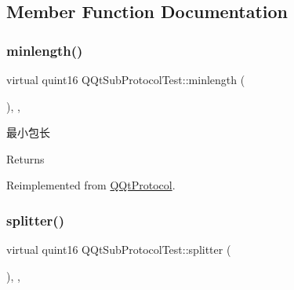 \subsection{Member Function Documentation}
\mbox{\label{class_q_qt_sub_protocol_test_a42b8ca064326139d26bc20e76f356a6a}} 
\subsubsection{\texorpdfstring{minlength()}{minlength()}}
{\footnotesize\ttfamily virtual quint16 Q\+Qt\+Sub\+Protocol\+Test\+::minlength (\begin{DoxyParamCaption}{ }\end{DoxyParamCaption})\hspace{0.3cm}{\ttfamily [inline]}, {\ttfamily [override]}, {\ttfamily [virtual]}}



最小包长 

\begin{DoxyReturn}{Returns}

\end{DoxyReturn}


Reimplemented from \mbox{\hyperlink{class_q_qt_protocol_a2b00f53d3dd0eed817eeecff422891f3}{Q\+Qt\+Protocol}}.

\mbox{\label{class_q_qt_sub_protocol_test_aaf24e5745a46de9a5d6dd4ba06a5603c}} 
\subsubsection{\texorpdfstring{splitter()}{splitter()}}
{\footnotesize\ttfamily virtual quint16 Q\+Qt\+Sub\+Protocol\+Test\+::splitter (\begin{DoxyParamCaption}\item[{const Q\+Byte\+Array \&}]{ }\end{DoxyParamCaption})\hspace{0.3cm}{\ttfamily [inline]}, {\ttfamily [override]}, {\ttfamily [virtual]}}



